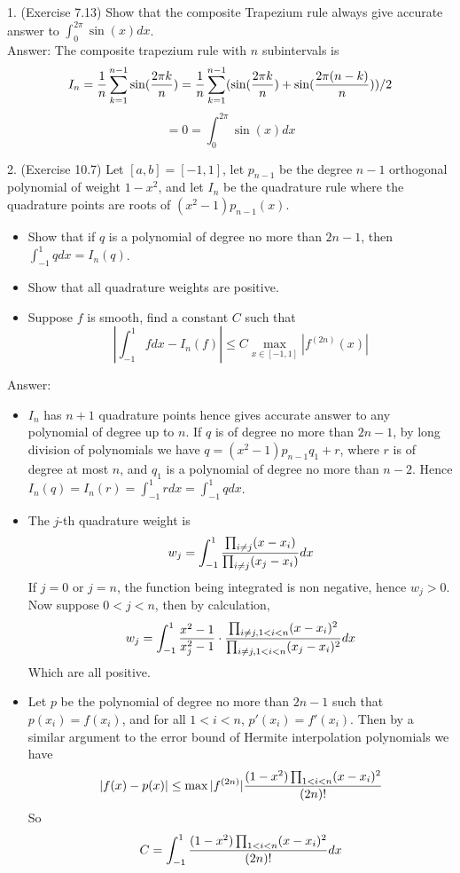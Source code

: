 \documentclass[20pt]{article} %
\theoremstyle{break}
\begin{document}
1. (Exercise 7.13) Show that the composite Trapezium rule always give accurate answer to $\int_0^{2\pi}\sin(x)dx$.\\  

Answer: The composite trapezium rule with $n$ subintervals is
\[I_n={1\over n}\sum_{k=1}^{n-1}\sin({2\pi k\over n})={1\over n}\sum_{k=1}^{n-1}(\sin({2\pi k\over n})+\sin({2\pi(n-k)\over n}))/2\]
\[=0=\int_0^{2\pi}\sin(x)dx\]

2. (Exercise 10.7) Let $[a, b]=[-1, 1]$, let $p_{n-1}$ be the degree $n-1$ orthogonal polynomial of weight $1-x^2$, and let $I_n$ be the quadrature rule where the quadrature points are roots of $(x^2-1)p_{n-1}(x)$.
\begin{itemize}
\item Show that if $q$ is a polynomial of degree no more than $2n-1$, then $\int_{-1}^1qdx=I_n(q)$.
\item Show that all quadrature weights are positive.
\item Suppose $f$ is smooth, find a constant $C$ such that
  \[|\int_{-1}^1fdx-I_n(f)|\leq C\max_{x\in [-1, 1]}|f^{(2n)}(x)|\]
\end{itemize}

Answer:\\

\begin{itemize}
\item $I_n$ has $n+1$ quadrature points hence gives accurate answer to any polynomial of degree up to $n$. If $q$ is of degree no more than $2n-1$, by long division of polynomials we have $q=(x^2-1)p_{n-1}q_1+r$, where $r$ is of degree at most $n$, and $q_1$ is a polynomial of degree no more than $n-2$. Hence $I_n(q)=I_n(r)=\int_{-1}^1rdx=\int_{-1}^1qdx$.  
\item The $j$-th quadrature weight is
  \[w_j=\int_{-1}^1 {\prod_{i\not=j}(x-x_i)\over \prod_{i\not=j}(x_j-x_i)}dx\]
  If $j=0$ or $j=n$, the function being integrated is non negative, hence $w_j>0$. Now suppose $0<j<n$, then by calculation,
  \[w_j=\int_{-1}^1{x^2-1\over x_j^2-1}\cdot {\prod_{i\not=j, 1<i<n}(x-x_i)^2\over \prod_{i\not=j, 1<i<n}(x_j-x_i)^2}dx\]
  Which are all positive.
\item Let $p$ be the polynomial of degree no more than $2n-1$ such that $p(x_i)=f(x_i)$, and for all $1<i<n$, $p'(x_i)=f'(x_i)$. Then by a similar argument to the error bound of Hermite interpolation polynomials we have
  \[|f(x)-p(x)|\leq \max|f^{(2n)}|{(1-x^2)\prod_{1<i<n}(x-x_i)^2\over (2n)!}\]
  So
  \[C=\int_{-1}^1 {(1-x^2)\prod_{1<i<n}(x-x_i)^2\over (2n)!}dx\]
\end{itemize}
\end{document}
